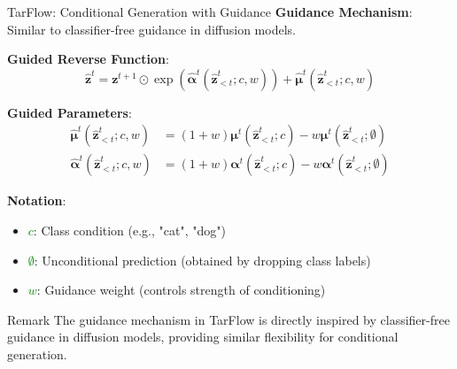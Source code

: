 \documentclass[aspectratio=169]{beamer}
\begin{document}
\begin{frame}{TarFlow: Conditional Generation with Guidance}
\textbf{Guidance Mechanism}: Similar to classifier-free guidance in diffusion models.

\textbf{Guided Reverse Function}:
\begin{equation}
    \hat{\mathbf{z}}^t = \mathbf{z}^{t+1} \odot \exp(\hat{\boldsymbol{\alpha}}^t(\hat{\mathbf{z}}_{<t}^t; c, w)) + \hat{\boldsymbol{\mu}}^t(\hat{\mathbf{z}}_{<t}^t; c, w)
\end{equation}

\textbf{Guided Parameters}:
\begin{align}
    \hat{\boldsymbol{\mu}}^t(\hat{\mathbf{z}}_{<t}^t; c, w) &= (1 + w)\boldsymbol{\mu}^t(\hat{\mathbf{z}}_{<t}^t; c) - w\boldsymbol{\mu}^t(\hat{\mathbf{z}}_{<t}^t; \emptyset) \\
    \hat{\boldsymbol{\alpha}}^t(\hat{\mathbf{z}}_{<t}^t; c, w) &= (1 + w)\boldsymbol{\alpha}^t(\hat{\mathbf{z}}_{<t}^t; c) - w\boldsymbol{\alpha}^t(\hat{\mathbf{z}}_{<t}^t; \emptyset)
\end{align}

\textbf{Notation}:
\begin{itemize}
    \item \textcolor{green}{$c$}: Class condition (e.g., "cat", "dog")
    \item \textcolor{green}{$\emptyset$}: Unconditional prediction (obtained by dropping class labels)
    \item \textcolor{green}{$w$}: Guidance weight (controls strength of conditioning)
\end{itemize}


\begin{alertblock}{Remark}
    The guidance mechanism in TarFlow is directly inspired by classifier-free guidance in diffusion models, providing similar flexibility for conditional generation.
\end{alertblock}
\end{frame}
\end{document}
